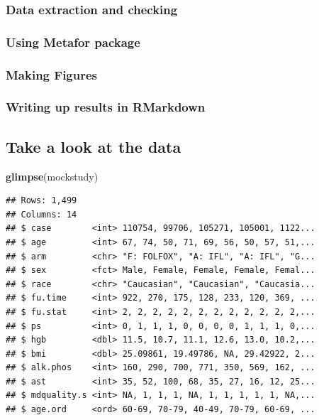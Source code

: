 \documentclass[
]{book}
\newenvironment{Shaded}{\begin{snugshade}}{\end{snugshade}}
\newcommand{\KeywordTok}[1]{\textcolor[rgb]{0.13,0.29,0.53}{\textbf{#1}}}
\newcommand{\NormalTok}[1]{#1}
\begin{document}
\hypertarget{data-extraction-and-checking}{%
\subsubsection{Data extraction and checking}\label{data-extraction-and-checking}}

\hypertarget{using-metafor-package}{%
\subsubsection{Using Metafor package}\label{using-metafor-package}}

\hypertarget{making-figures}{%
\subsubsection{Making Figures}\label{making-figures}}

\hypertarget{writing-up-results-in-rmarkdown}{%
\subsubsection{Writing up results in RMarkdown}\label{writing-up-results-in-rmarkdown}}

\hypertarget{take-a-look-at-the-data}{%
\subsection{Take a look at the data}\label{take-a-look-at-the-data}}

\begin{Shaded}
\begin{Highlighting}[]
\KeywordTok{glimpse}\NormalTok{(mockstudy)}
\end{Highlighting}
\end{Shaded}

\begin{verbatim}
## Rows: 1,499
## Columns: 14
## $ case        <int> 110754, 99706, 105271, 105001, 1122...
## $ age         <int> 67, 74, 50, 71, 69, 56, 50, 57, 51,...
## $ arm         <chr> "F: FOLFOX", "A: IFL", "A: IFL", "G...
## $ sex         <fct> Male, Female, Female, Female, Femal...
## $ race        <chr> "Caucasian", "Caucasian", "Caucasia...
## $ fu.time     <int> 922, 270, 175, 128, 233, 120, 369, ...
## $ fu.stat     <int> 2, 2, 2, 2, 2, 2, 2, 2, 2, 2, 2, 2,...
## $ ps          <int> 0, 1, 1, 1, 0, 0, 0, 0, 1, 1, 1, 0,...
## $ hgb         <dbl> 11.5, 10.7, 11.1, 12.6, 13.0, 10.2,...
## $ bmi         <dbl> 25.09861, 19.49786, NA, 29.42922, 2...
## $ alk.phos    <int> 160, 290, 700, 771, 350, 569, 162, ...
## $ ast         <int> 35, 52, 100, 68, 35, 27, 16, 12, 25...
## $ mdquality.s <int> NA, 1, 1, 1, NA, 1, 1, 1, 1, 1, NA,...
## $ age.ord     <ord> 60-69, 70-79, 40-49, 70-79, 60-69, ...
\end{verbatim}
\end{document}
